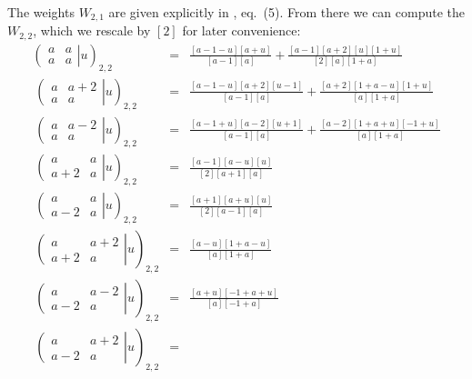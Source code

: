 \documentclass[11pt]{article}
\begin{document}
The weights $W_{2,1}$ are given explicitly in \cite{Date}, eq.~(5). From there we can compute the $W_{2,2}$, which we rescale by $[2]$ for later convenience: 
%
\begin{eqnarray}
  \left. \left( \begin{array}{cc} a & a \\ a & a \end{array} \right| u  \right)_{2,2} &=& 
  \frac{[a-1-u][a+u]}{[a-1][a]} + \frac{[a-1][a+2][u][1+u]}{[2] [a] [1+a]} \\
  \
   \left. \left( \begin{array}{cc} a & a+2 \\ a & a \end{array} \right| u  \right)_{2,2} &=& 
  \frac{[a-1-u][a+2][u-1]}{[a-1][a]} + \frac{[a+2][1+a-u][1+u]}{ [a] [1+a]} \\
    \
   \left. \left( \begin{array}{cc} a & a-2 \\ a & a \end{array} \right| u  \right)_{2,2} &=& 
   \frac{[a-1+u][a-2][u+1]}{[a-1][a]} + \frac{[a-2][1+a+u][-1+u]}{ [a] [1+a]} \\
     \
   \left. \left( \begin{array}{cc} a & a \\ a+2 & a \end{array} \right| u  \right)_{2,2} &=& 
   \frac{[a-1][a-u][u]}{[2][a+1][a]}  \\
     \
   \left. \left( \begin{array}{cc} a & a \\ a-2 & a \end{array} \right| u  \right)_{2,2} &=& 
     \frac{[a+1][a+u][u]}{[2][a-1][a]}  \\
       \
   \left. \left( \begin{array}{cc} a & a+2 \\ a+2 & a \end{array} \right| u  \right)_{2,2} &=& 
   \frac{[a-u][1+a-u]}{[a][1+a]} \\
         \
   \left. \left( \begin{array}{cc} a & a-2 \\ a-2 & a \end{array} \right| u  \right)_{2,2} &=& 
   \frac{[a+u][-1+a+u]}{[a][-1+a]} \\
         \
   \left. \left( \begin{array}{cc} a & a+2 \\ a-2 & a \end{array} \right| u  \right)_{2,2} &=& 

\end{eqnarray}
\end{document}
